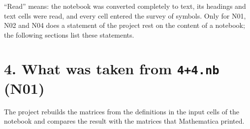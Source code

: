 \documentclass[
  10pt,
]{article}
\begin{document}
``Read'' means: the notebook was converted completely to text, its
headings and text cells were read, and every cell entered the survey of
symbols. Only for N01, N02 and N04 does a statement of the project rest
on the content of a notebook; the following sections list these
statements.

\hypertarget{what-was-taken-from-44.nb-n01}{%
\section{\texorpdfstring{4. What was taken from \texttt{4+4.nb}
(N01)}{4. What was taken from 4+4.nb (N01)}}\label{what-was-taken-from-44.nb-n01}}

The project rebuilds the matrices from the definitions in the input
cells of the notebook and compares the result with the matrices that
Mathematica printed.
\end{document}
